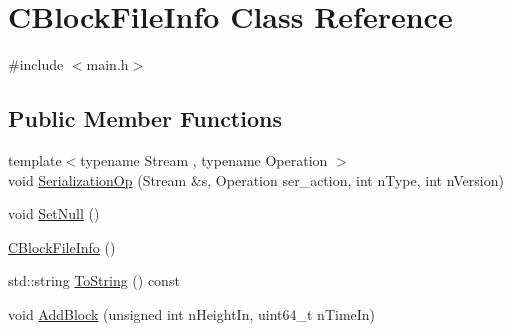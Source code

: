 \hypertarget{class_c_block_file_info}{}\section{C\+Block\+File\+Info Class Reference}
\label{class_c_block_file_info}


{\ttfamily \#include $<$main.\+h$>$}

\subsection*{Public Member Functions}
\begin{DoxyCompactItemize}
\item 
{\footnotesize template$<$typename Stream , typename Operation $>$ }\\void \mbox{\hyperlink{class_c_block_file_info_a5d48a4fe1f8b3903131d121fc14a5a6f}{Serialization\+Op}} (Stream \&s, Operation ser\+\_\+action, int n\+Type, int n\+Version)
\item 
void \mbox{\hyperlink{class_c_block_file_info_a21bd4f8e92c47646737fc57446a86cc2}{Set\+Null}} ()
\item 
\mbox{\hyperlink{class_c_block_file_info_a4d08bfcfc45a16b40266255f8597c949}{C\+Block\+File\+Info}} ()
\item 
std\+::string \mbox{\hyperlink{class_c_block_file_info_a2754dd93534e2fda8674ffc5d007611e}{To\+String}} () const
\item 
void \mbox{\hyperlink{class_c_block_file_info_a66867569ffe06068b8c6eb1139934fbf}{Add\+Block}} (unsigned int n\+Height\+In, uint64\+\_\+t n\+Time\+In)
\end{DoxyCompactItemize}

